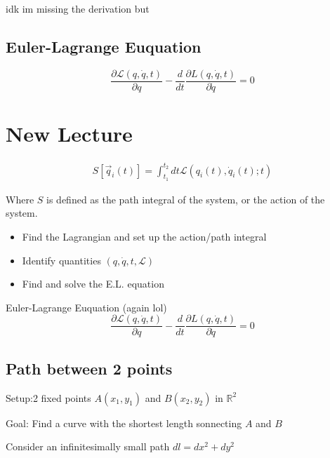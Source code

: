 \documentclass[fleqn]{report}
\newcommand{\del}{\partial}
\newcommand{\equations} [1] {
\begin{gather*}
#1
\end{gather*}
}
\begin{document}
idk im missing the derivation but 

\subsection{Euler-Lagrange Euquation}
\[
\frac{\del \mathcal L(q, \dot q, t)}{\del q} - 
\frac{d}{dt} \frac{\del L(q, \dot q, t)}{\del \dot q} = 0
\]

\section{New Lecture}
\equations{
    S[\vec q_i(t)]
    =
    \int^{t_2}_{t_1} dt \mathcal L(q_i(t), \dot q_i(t); t)
}
Where $S$ is defined as the path integral of the system, or the action 
of the system. 

\begin{itemize}
    \item
    Find the Lagrangian and set up the action/path integral 
    \item 
    Identify quantities $(q, \dot q, t, \mathcal L)$
    \item 
    Find and solve the E.L. equation
\end{itemize}
Euler-Lagrange Euquation (again lol)
\[
\frac{\del \mathcal L(q, \dot q, t)}{\del q} - 
\frac{d}{dt} \frac{\del L(q, \dot q, t)}{\del \dot q} = 0
\]

\subsection{Path between 2 points}
Setup:2 fixed points $A(x_1, y_1)$ and $B(x_2, y_2)$ in $\mathbb R^2$

Goal: Find a curve with the shortest length sonnecting $A$ and $B$ 

Consider an infinitesimally small path $dl = dx^2 + dy^2$
\end{document}
